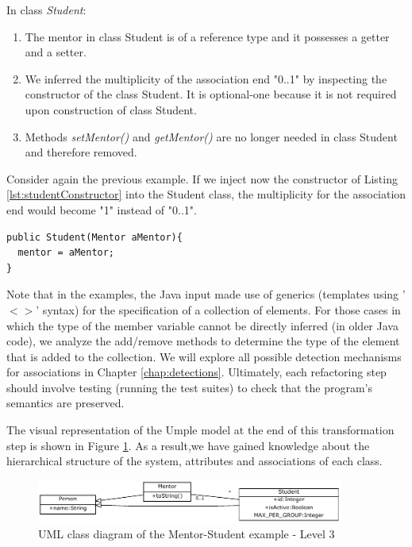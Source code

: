 In class \textit{Student}:
\begin{enumerate}

\item The mentor in class Student is of a reference type and it possesses a getter and a setter.
\item We inferred the multiplicity of the association end "0..1" by inspecting the constructor of the class Student. It is optional-one because it is not required upon construction of class Student. 
\item Methods \textit{setMentor()} and \textit{getMentor()} are no longer needed in class Student and therefore removed.
\end{enumerate}

Consider again the previous example.  If we inject now the constructor of Listing \ref{lst:studentConstructor} into the Student class, the multiplicity for the association end would become "1" instead of "0..1". 

\begin{lstlisting}[style=java,caption=A new constructor added to Student class,label=lst:studentConstructor]
public Student(Mentor aMentor){
  mentor = aMentor;
}
\end{lstlisting}

Note that in the examples, the Java input made use of generics (templates using '$<>$' syntax) for the specification of a collection of elements. For those cases in which the type of the member variable cannot be directly inferred (in older Java code), we analyze the add/remove methods to determine the type of the element that is added to the collection. We will explore all possible detection mechanisms for associations in Chapter \ref{chap:detections}. Ultimately, each refactoring step should involve testing (running the test suites) to check that the program's semantics are preserved. 

The visual representation of the Umple model at the end of this transformation step is shown in Figure \ref{fig:Example1a3}. As a result,we have gained knowledge about the hierarchical structure of the system, attributes and associations of each class. 

\begin{figure}[h]
\centering
\includegraphics[width=0.90\textwidth]{Figures/Example1a3.pdf} 
\caption{UML class diagram of the Mentor-Student example - Level 3}
\label{fig:Example1a3}
\end{figure}

